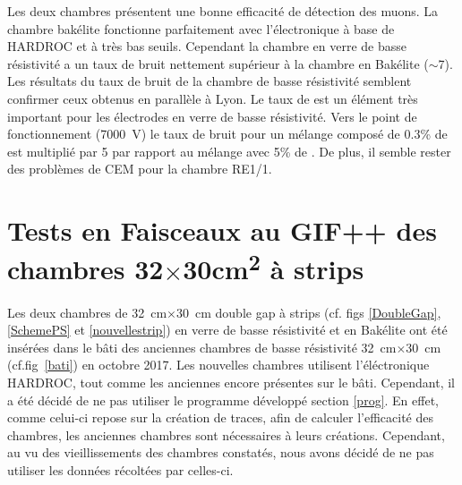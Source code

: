 Les deux chambres présentent une bonne efficacité de détection des muons. La chambre bakélite fonctionne parfaitement avec l'électronique à base de HARDROC et à très bas seuils. Cependant la chambre en verre de basse résistivité a un taux de bruit nettement supérieur à la chambre en Bakélite ($\sim$\num{7}). Les résultats du taux de bruit de la chambre de basse résistivité semblent confirmer ceux obtenus en parallèle à Lyon. Le taux de  est un élément très important pour les électrodes en verre de basse résistivité. Vers le point de fonctionnement (\SI{7000}{\volt}) le taux de bruit pour un mélange composé de \num{0.3}\% de  est multiplié par \num{5} par rapport au mélange avec \num{5}\% de . De plus, il semble rester des problèmes de CEM pour la chambre RE1/1.


\section{Tests en Faisceaux au GIF++ des chambres \texorpdfstring{\num{32}$\times$\num{30}\si{\square\centi\meter}}{30cm x 30cm} à strips}
\label{smallchamber}

Les deux chambres de \SI{32}{\centi\meter}$\times$\SI{30}{\centi\meter} double gap à strips (cf. figs \ref{DoubleGap}, \ref{SchemePS} et \ref{nouvellestrip}) en verre de basse résistivité et en Bakélite ont été insérées dans le bâti des anciennes chambres de basse résistivité \SI{32}{\centi\meter}$\times$\SI{30}{\centi\meter} (cf.fig~\ref{bati}) en octobre 2017. Les nouvelles chambres utilisent l'éléctronique HARDROC, tout comme les anciennes encore présentes sur le bâti. Cependant, il a été décidé de ne pas utiliser le programme développé section \ref{prog}. En effet, comme celui-ci repose sur la création de traces, afin de calculer l'efficacité des chambres, les anciennes chambres sont nécessaires à leurs créations. Cependant, au vu des vieillissements des chambres constatés, nous avons décidé de ne pas utiliser les données récoltées par celles-ci.

